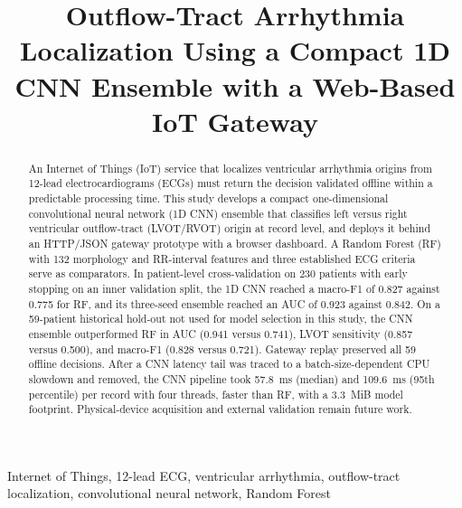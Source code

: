 \documentclass[conference,a4paper]{IEEEtran}
\begin{document}
\title{Outflow-Tract Arrhythmia Localization Using a Compact 1D CNN Ensemble with a Web-Based IoT Gateway}
\author{
\and
{}
}
\maketitle

\begin{abstract}
An Internet of Things (IoT) service that localizes ventricular arrhythmia origins from 12-lead electrocardiograms (ECGs) must return the decision validated offline within a predictable processing time. This study develops a compact one-dimensional convolutional neural network (1D CNN) ensemble that classifies left versus right ventricular outflow-tract (LVOT/RVOT) origin at record level, and deploys it behind an HTTP/JSON gateway prototype with a browser dashboard. A Random Forest (RF) with 132 morphology and RR-interval features and three established ECG criteria serve as comparators. In patient-level cross-validation on 230 patients with early stopping on an inner validation split, the 1D CNN reached a macro-F1 of 0.827 against 0.775 for RF, and its three-seed ensemble reached an AUC of 0.923 against 0.842. On a 59-patient historical hold-out not used for model selection in this study, the CNN ensemble outperformed RF in AUC (0.941 versus 0.741), LVOT sensitivity (0.857 versus 0.500), and macro-F1 (0.828 versus 0.721). Gateway replay preserved all 59 offline decisions. After a CNN latency tail was traced to a batch-size-dependent CPU slowdown and removed, the CNN pipeline took 57.8~ms (median) and 109.6~ms (95th percentile) per record with four threads, faster than RF, with a 3.3~MiB model footprint. Physical-device acquisition and external validation remain future work.
\end{abstract}
\begin{IEEEkeywords}
Internet of Things, 12-lead ECG, ventricular arrhythmia, outflow-tract localization, convolutional neural network, Random Forest
\end{IEEEkeywords}
\end{document}

